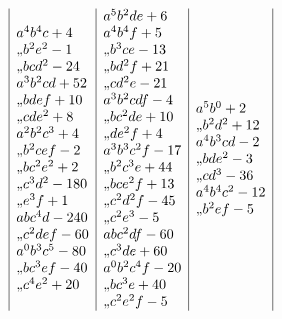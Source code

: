\documentclass[11pt]{article}
\providecommand{\ditto}{\mathord{\hbox{,,}}}
\begin{document}
\[{\begin{array}{|l|l|l|l|l|l|}
\begin{array}{@{}l@{}}
a^{4}b^{4}c+4\\
\ditto b^{2}e^{2}-1\\
\ditto bcd^{2}-24\\
a^{3}b^{2}cd+52\\
\ditto bdef+10\\
\ditto cde^{2}+8\\
a^{2}b^{2}c^{3}+4\\
\ditto b^{2}cef-2\\
\ditto bc^{2}e^{2}+2\\
\ditto c^{3}d^{2}-180\\
\ditto e^{3}f+1\\
abc^{4}d-240\\
\ditto c^{2}def-60\\
a^{0}b^{3}c^{5}-80\\
\ditto bc^{3}ef-40\\
\ditto c^{4}e^{2}+20
\end{array}
&
\begin{array}{@{}l@{}}
a^{5}b^{2}de+6\\
a^{4}b^{4}f+5\\
\ditto b^{3}ce-13\\
\ditto bd^{2}f+21\\
\ditto cd^{2}e-21\\
a^{3}b^{2}cdf-4\\
\ditto bc^{2}de+10\\
\ditto de^{2}f+4\\
a^{3}b^{3}c^{2}f-17\\
\ditto b^{2}c^{3}e+44\\
\ditto bce^{2}f+13\\
\ditto c^{2}d^{2}f-45\\
\ditto c^{2}e^{3}-5\\
abc^{2}df-60\\
\ditto c^{3}de+60\\
a^{0}b^{2}c^{4}f-20\\
\ditto bc^{3}e+40\\
\ditto c^{2}e^{2}f-5
\end{array}
&
\begin{array}{@{}l@{}}
a^{5}b^{0}+2\\
\ditto b^{2}d^{2}+12\\
a^{4}b^{3}cd-2\\
\ditto bde^{2}-3\\
\ditto cd^{3}-36\\
a^{4}b^{4}c^{2}-12\\
\ditto b^{2}ef-5\\

\end{array}
\end{array}}\]
\end{document}
